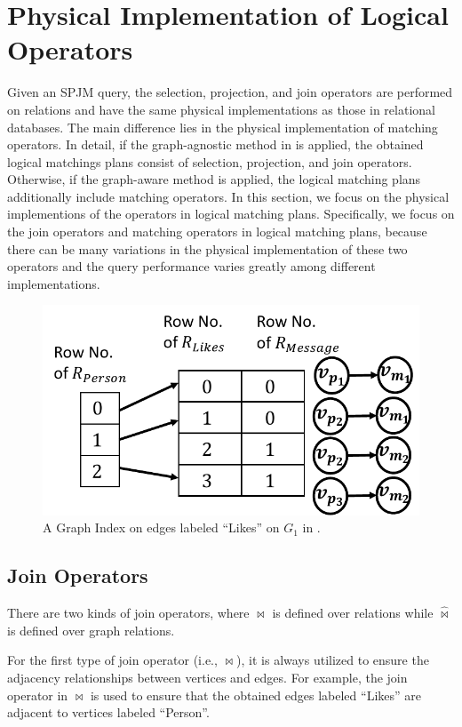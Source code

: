 \section{Physical Implementation of Logical Operators}

Given an SPJM query, the selection, projection, and join operators are performed on relations and have the same physical implementations as those in relational databases.
The main difference lies in the physical implementation of matching operators.
In detail, if the graph-agnostic method in  is applied, the obtained logical matchings plans consist of selection, projection, and join operators.
Otherwise, if the graph-aware method is applied, the logical matching plans additionally include matching operators.
In this section, we focus on the physical implementions of the operators in logical matching plans.
Specifically, we focus on the join operators and matching operators in logical matching plans, because there can be many variations in the physical implementation of these two operators and the query performance varies greatly among different implementations. 

\begin{figure}
    \centering
    \includegraphics[width=.8\linewidth]{./figures/graph-index-likes.pdf}
    \caption{A Graph Index on edges labeled ``Likes'' on $G_1$ in .}
    \label{fig:graph-index}
\end{figure}

\subsection{Join Operators}
\label{sec:join-operator}
There are two kinds of join operators, where $\Join$ is defined over relations while $\widehat{\Join}$ is defined over graph relations.

For the first type of join operator (i.e., $\Join$), it is always utilized to ensure the adjacency relationships between vertices and edges.
For example, the join operator in  $\Join$  is used to ensure that the obtained edges labeled ``Likes'' are adjacent to vertices labeled ``Person''.

